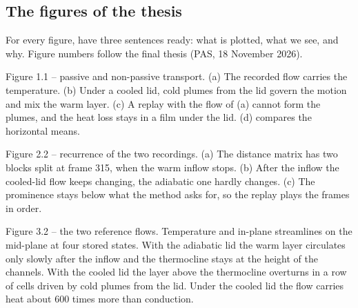\subsection{The figures of the thesis}

For every figure, have three sentences ready: what is plotted, what we see, and why. Figure numbers
follow the final thesis (PAS, 18 November 2026).

\begin{qabox}{Figure 1.1 -- passive and non-passive transport.}
\explain (a) The recorded flow carries the temperature. (b) Under a cooled lid, cold plumes from the
lid govern the motion and mix the warm layer. (c) A replay with the flow of (a) cannot form the
plumes, and the heat loss stays in a film under the lid. (d) compares the horizontal means.
\end{qabox}

\begin{qabox}{Figure 2.2 -- recurrence of the two recordings.}
\explain (a) The distance matrix has two blocks split at frame 315, when the warm inflow stops.
(b) After the inflow the cooled-lid flow keeps changing, the adiabatic one hardly changes. (c) The
prominence stays below what the method asks for, so the replay plays the frames in order.
\end{qabox}

\begin{qabox}{Figure 3.2 -- the two reference flows.}
\explain Temperature and in-plane streamlines on the mid-plane at four stored states. With the
adiabatic lid the warm layer circulates only slowly after the inflow and the thermocline stays at
the height of the channels. With the cooled lid the layer above the thermocline overturns in a row
of cells driven by cold plumes from the lid. Under the cooled lid the flow carries heat about 600
times more than conduction.
\end{qabox}


